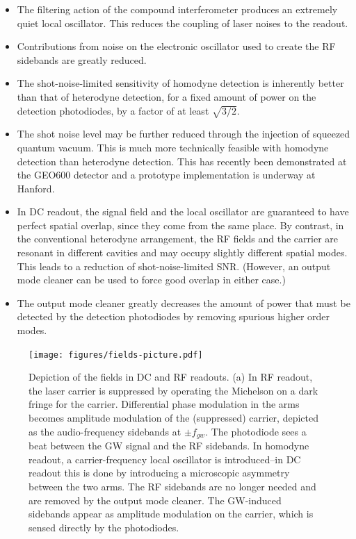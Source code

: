 \begin{itemize}
\item The filtering action of the compound interferometer produces an
  extremely quiet local oscillator.  This reduces the coupling of
  laser noises to the readout.
\item Contributions from noise on the electronic oscillator used to
  create the RF sidebands are greatly reduced.
\item The shot-noise-limited sensitivity of homodyne detection is
  inherently better than that of heterodyne detection, for a fixed
  amount of power on the detection photodiodes, by a factor of at
  least $\sqrt{3/2}$.
\item The shot noise level may be further reduced through the
  injection of squeezed quantum vacuum.  This is much more technically
  feasible with homodyne detection than heterodyne detection.  This
  has recently been demonstrated at the GEO600 detector and a
  prototype implementation is underway at Hanford.
\item In DC readout, the signal field and the local oscillator are
  guaranteed to have perfect spatial overlap, since they come from the
  same place.  By contrast, in the conventional heterodyne
  arrangement, the RF fields and the carrier are resonant in different
  cavities and may occupy slightly different spatial modes.  This
  leads to a reduction of shot-noise-limited SNR.  (However, an output
  mode cleaner can be used to force good overlap in either case.)
\item The output mode cleaner greatly decreases the amount of power
  that must be detected by the detection photodiodes by removing
  spurious higher order modes.  
  
\end{itemize}

\begin{figure}
\texttt{[image: figures/fields-picture.pdf]}
\caption[Frequency-domain fields in DC and RF
  readouts]{\label{fig:sideband-picture}Depiction of the fields in DC
  and RF readouts.  (a) In RF readout, the laser carrier is suppressed
  by operating the Michelson on a dark fringe for the carrier.
  Differential phase modulation in the arms becomes amplitude
  modulation of the (suppressed) carrier, depicted as the
  audio-frequency sidebands at $\pm f_{gw}$.  The photodiode sees a
  beat between the GW signal and the RF sidebands.  In homodyne
  readout, a carrier-frequency local oscillator is introduced--in DC
  readout this is done by introducing a microscopic asymmetry between
  the two arms.  The RF sidebands are no longer needed and are removed
  by the output mode cleaner.  The GW-induced sidebands appear as
  amplitude modulation on the carrier, which is sensed directly by the
  photodiodes.}
\end{figure}


